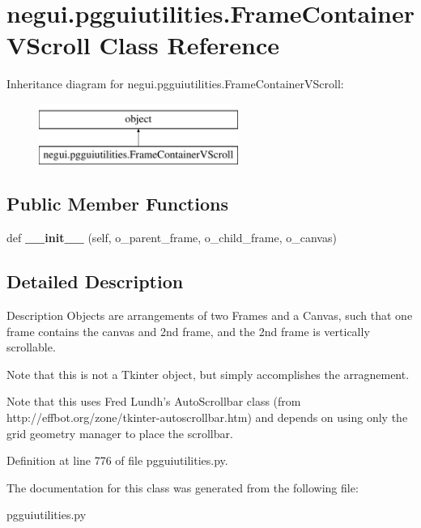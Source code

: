 \hypertarget{classnegui_1_1pgguiutilities_1_1FrameContainerVScroll}{}\section{negui.\+pgguiutilities.\+Frame\+Container\+V\+Scroll Class Reference}
\label{classnegui_1_1pgguiutilities_1_1FrameContainerVScroll}
Inheritance diagram for negui.\+pgguiutilities.\+Frame\+Container\+V\+Scroll\+:\begin{figure}[H]
\begin{center}
\leavevmode
\includegraphics[height=2.000000cm]{classnegui_1_1pgguiutilities_1_1FrameContainerVScroll}
\end{center}
\end{figure}
\subsection*{Public Member Functions}
\begin{DoxyCompactItemize}
\item 
def {\bfseries \+\_\+\+\_\+init\+\_\+\+\_\+} (self, o\+\_\+parent\+\_\+frame, o\+\_\+child\+\_\+frame, o\+\_\+canvas)\hypertarget{classnegui_1_1pgguiutilities_1_1FrameContainerVScroll_a77671bf20cb4175f0788de78bda3445f}{}\label{classnegui_1_1pgguiutilities_1_1FrameContainerVScroll_a77671bf20cb4175f0788de78bda3445f}

\end{DoxyCompactItemize}


\subsection{Detailed Description}
\begin{DoxyVerb}Description
Objects are arrangements of two Frames and a 
Canvas, such that one frame contains the 
canvas and 2nd frame, and the 2nd frame 
is vertically scrollable.

Note that this is not a Tkinter object, but
simply accomplishes the arragnement. 

Note that this uses Fred Lundh's AutoScrollbar class
(from http://effbot.org/zone/tkinter-autoscrollbar.htm)
and depends on using only the grid geometry manager to place
the scrollbar.
\end{DoxyVerb}
 

Definition at line 776 of file pgguiutilities.\+py.



The documentation for this class was generated from the following file\+:\begin{DoxyCompactItemize}
\item 
pgguiutilities.\+py\end{DoxyCompactItemize}
